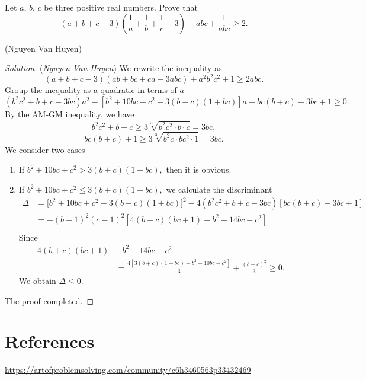 \documentclass[12pt,a4paper]{book}
\begin{document}
\begin{pro}
Let $a,\,b,\,c$ be three positive real numbers. Prove that
\[(a+b+c-3)\left(\frac{1}{a}+\frac{1}{b}+\frac{1}{c}-3\right)+abc+\frac{1}{abc} \geqslant 2.\]
\begin{flushright}(Nguyen Van Huyen)\end{flushright}
\end{pro}

\begin{proof}[\cmss\problemColor Solution] (\textit{Nguyen Van Huyen}) We rewrite the inequality as
\[(a+b+c-3)(ab+bc+ca-3abc)+a^2b^2c^2+1 \geqslant 2abc.\]
Group the inequality as a quadratic in terms of $a$
\[(b^2c^2+b+c-3bc)a^2 - [b^2+10bc+c^2 - 3(b+c)(1+bc)]a + bc(b+c) - 3bc + 1 \ge 0.\]
By the AM-GM inequality, we have
\[b^2c^2+b+c \geqslant 3\sqrt[3]{b^2c^2 \cdot b \cdot c} = 3bc,\]
\[bc(b+c) + 1 \geqslant 3\sqrt[3]{b^2c \cdot bc^2 \cdot 1} = 3bc.\]
We consider two cases
\begin{enumerate}[(1)]
\item If $b^2+10bc+c^2 > 3(b+c)(1+bc),$ then it is obvious.
\item If $b^2+10bc+c^2 \le 3(b+c)(1+bc),$ we calculate the discriminant
\[\begin{aligned}
\Delta &= \big[b^2+10bc+c^2 - 3(b+c)(1+bc)\big]^2 - 4(b^2c^2+b+c-3bc)[bc(b+c) - 3bc + 1] \\
&= -(b-1)^2(c-1)^2[4(b+c)(bc+1) - b^2-14bc-c^2] \\
\end{aligned}\]
Since 
\[\begin{aligned}
4(b+c)(bc+1) &- b^2-14bc-c^2 \\&= \frac{4[3(b+c)(1+bc)-b^2-10bc-c^2]}{3}+\frac{(b-c)^2}{3} \ge 0.
\end{aligned}\] 
We obtain $\Delta \le 0.$
\end{enumerate}
The proof completed.
\end{proof}

\section*{References}

\begin{enumerate}[label={[\arabic*]}]
\item \href{https://artofproblemsolving.com/community/c6h3460563p33432469}{\url{https://artofproblemsolving.com/community/c6h3460563p33432469}}
\end{enumerate}
\end{document}
